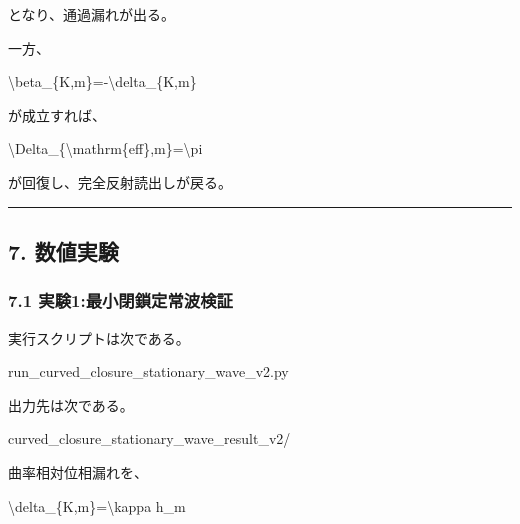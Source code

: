 \documentclass[
  a4paper,
]{article}
\newenvironment{Shaded}{}{}
\newcommand{\NormalTok}[1]{#1}
\begin{document}
となり、通過漏れが出る。

一方、

\begin{Shaded}
\begin{Highlighting}[]
\NormalTok{\textbackslash{}beta\_\{K,m\}={-}\textbackslash{}delta\_\{K,m\}}
\end{Highlighting}
\end{Shaded}

が成立すれば、

\begin{Shaded}
\begin{Highlighting}[]
\NormalTok{\textbackslash{}Delta\_\{\textbackslash{}mathrm\{eff\},m\}=\textbackslash{}pi}
\end{Highlighting}
\end{Shaded}

が回復し、完全反射読出しが戻る。

\begin{center}\rule{0.5\linewidth}{0.5pt}\end{center}

\subsection{7. 数値実験}\label{ux6570ux5024ux5b9fux9a13}

\subsubsection{7.1
実験1:最小閉鎖定常波検証}\label{ux5b9fux9a131ux6700ux5c0fux9589ux9396ux5b9aux5e38ux6ce2ux691cux8a3c}

実行スクリプトは次である。

\begin{Shaded}
\begin{Highlighting}[]
\NormalTok{run\_curved\_closure\_stationary\_wave\_v2.py}
\end{Highlighting}
\end{Shaded}

出力先は次である。

\begin{Shaded}
\begin{Highlighting}[]
\NormalTok{curved\_closure\_stationary\_wave\_result\_v2/}
\end{Highlighting}
\end{Shaded}

曲率相対位相漏れを、

\begin{Shaded}
\begin{Highlighting}[]
\NormalTok{\textbackslash{}delta\_\{K,m\}=\textbackslash{}kappa h\_m}
\end{Highlighting}
\end{Shaded}
\end{document}
